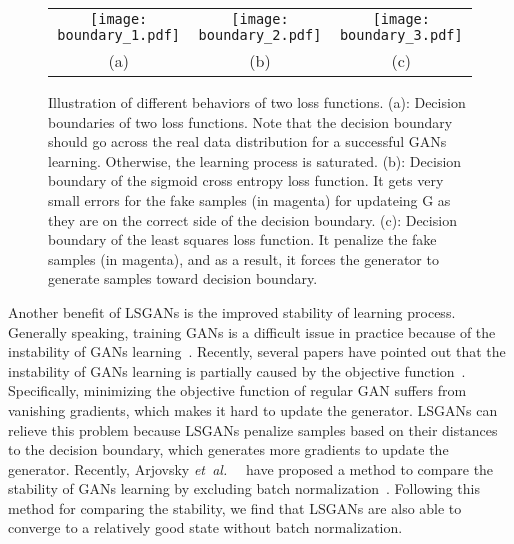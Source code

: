 \documentclass{article} %
\def\etal{{\textit{et~al.~}}}
\begin{document}
\begin{figure*}[t]
\centering
\begin{tabular}{ccc}

 \texttt{[image: boundary\_1.pdf]}
 &
 \texttt{[image: boundary\_2.pdf]}
  &
 \texttt{[image: boundary\_3.pdf]}
\\
(a)
&
(b)
&
(c)
\end{tabular}
\caption{
Illustration of different behaviors of two loss functions. (a): Decision boundaries of two loss functions. Note that the decision boundary should go across the real data distribution for a successful GANs learning. Otherwise, the learning process is saturated. (b): Decision boundary of the sigmoid cross entropy loss function. It gets very small errors for the fake samples (in magenta) for updateing G as they are on the correct side of the decision boundary. (c): Decision boundary of the least squares loss function. It penalize the fake samples (in magenta), and as a result, it forces the generator to generate samples toward decision boundary.
}
\label{fig:boundary}
\end{figure*}

Another benefit of LSGANs is the improved stability of learning process. Generally speaking, training GANs is a difficult issue in practice because of the instability of GANs learning~\cite{Radford2015}. Recently, several papers have pointed out that the instability of GANs learning is partially caused by the objective function~\cite{Arjovsky2017, Metz2016,Qi2016}. Specifically, minimizing the objective function of regular GAN suffers from vanishing gradients, which makes it hard to update the generator. LSGANs can relieve this problem because LSGANs penalize samples based on their distances to the decision boundary, which generates more gradients to update the generator. Recently, Arjovsky \etal~\cite{Arjovsky2017} have proposed a method to compare the stability of GANs learning by excluding batch normalization~\cite{Ioffe2015}. Following this method for comparing the stability, we find that LSGANs are also able to converge to a relatively good state without batch normalization.
\end{document}
